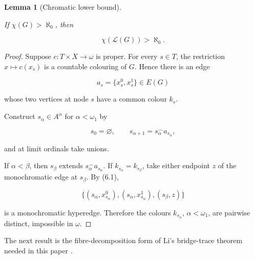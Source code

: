 \documentclass[a4paper,11pt,reqno]{amsart}
\theoremstyle{plain}
\newtheorem{lemma}[theorem]{Lemma}
\theoremstyle{definition}
\theoremstyle{remark}
\begin{document}
\begin{lemma}[Chromatic lower bound]\label{lemma-6.2-chromatic-lower-bound}

If \(\chi(G)>\aleph_0\), then

\[
\chi(\mathcal L(G))>\aleph_0.
\]

\end{lemma}
\begin{proof}
Suppose \(c:T\times X\to\omega\) is proper. For every \(s\in T\), the restriction \(x\mapsto c(x_s)\) is a countable colouring of \(G\). Hence there is an edge

\[
a_s=\{x_s^0,x_s^1\}\in E(G)
\]

whose two vertices at node \(s\) have a common colour \(k_s\).

Construct \(s_\alpha\in A^\alpha\) for \(\alpha<\omega_1\) by

\[
s_0=\varnothing,
\qquad s_{\alpha+1}=s_\alpha^\frown a_{s_\alpha},
\]

and at limit ordinals take unions.

If \(\alpha<\beta\), then \(s_\beta\) extends \(s_\alpha^\frown a_{s_\alpha}\). If \(k_{s_\alpha}=k_{s_\beta}\), take either endpoint \(z\) of the monochromatic edge at \(s_\beta\). By (6.1),

\[
\{(s_\alpha,x_{s_\alpha}^0),
  (s_\alpha,x_{s_\alpha}^1),
  (s_\beta,z)\}
\]

is a monochromatic hyperedge. Therefore the colours \(k_{s_\alpha}\), \(\alpha<\omega_1\), are pairwise distinct, impossible in \(\omega\).
\end{proof}

The next result is the fibre-decomposition form of Li's bridge-trace theorem
needed in this paper \citep[Theorem~4.6]{li2026}.
\end{document}
